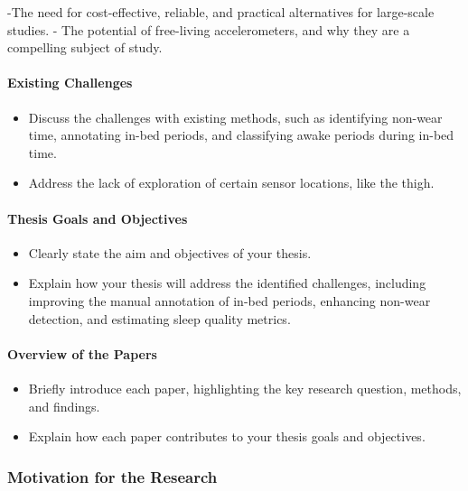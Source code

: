 \documentclass[
  10pt,
  letterpaper,
  DIV=11,
  numbers=noendperiod]{scrartcl}
\let\oldparagraph\paragraph
\renewcommand{\paragraph}[1]{\oldparagraph{#1}\mbox{}}
\providecommand{\tightlist}{%
  \setlength{\itemsep}{0pt}\setlength{\parskip}{0pt}}\usepackage{longtable,booktabs,array}
\begin{document}
-The need for cost-effective, reliable, and practical alternatives for
large-scale studies. - The potential of free-living accelerometers, and
why they are a compelling subject of study.

\hypertarget{existing-challenges}{%
\paragraph{Existing Challenges}\label{existing-challenges}}

\begin{itemize}
\tightlist
\item
  Discuss the challenges with existing methods, such as identifying
  non-wear time, annotating in-bed periods, and classifying awake
  periods during in-bed time.
\item
  Address the lack of exploration of certain sensor locations, like the
  thigh.
\end{itemize}

\hypertarget{thesis-goals-and-objectives}{%
\paragraph{Thesis Goals and
Objectives}\label{thesis-goals-and-objectives}}

\begin{itemize}
\tightlist
\item
  Clearly state the aim and objectives of your thesis.
\item
  Explain how your thesis will address the identified challenges,
  including improving the manual annotation of in-bed periods, enhancing
  non-wear detection, and estimating sleep quality metrics.
\end{itemize}

\hypertarget{overview-of-the-papers}{%
\paragraph{Overview of the Papers}\label{overview-of-the-papers}}

\begin{itemize}
\item
  Briefly introduce each paper, highlighting the key research question,
  methods, and findings.
\item
  Explain how each paper contributes to your thesis goals and
  objectives.
\end{itemize}

\hypertarget{motivation-for-the-research}{%
\subsubsection{Motivation for the
Research}\label{motivation-for-the-research}}
\end{document}
